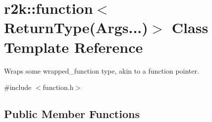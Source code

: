 \hypertarget{classr2k_1_1function_3_01_return_type_07_args_8_8_8_08_4}{}\section{r2k\+::function$<$ Return\+Type(Args...)$>$ Class Template Reference}
\label{classr2k_1_1function_3_01_return_type_07_args_8_8_8_08_4}


Wraps some wrapped\+\_\+function type, akin to a function pointer.  




{\ttfamily \#include $<$function.\+h$>$}

\subsection*{Public Member Functions}
